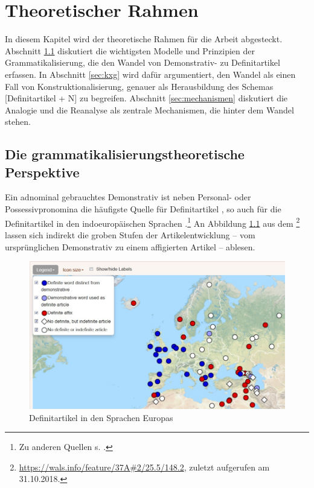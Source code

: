 \chapter{Theoretischer Rahmen} \label{chapter:theorie}

In diesem Kapitel wird der theoretische Rahmen für die Arbeit abgesteckt. 
Abschnitt \ref{sec:gram} diskutiert die wichtigsten Modelle und Prinzipien  der Grammatikalisierung, die den Wandel von Demonstrativ- zu Definitartikel erfassen. In Abschnitt \ref{sec:kxg} wird dafür argumentiert, den Wandel als einen Fall von Konstruktionalisierung, genauer als Herausbildung des Schemas [Definitartikel + N] zu begreifen. Abschnitt \ref{sec:mechanismen} diskutiert die Analogie und die Reanalyse als zentrale Mechanismen, die hinter dem Wandel stehen.  

\section{Die grammatikalisierungstheoretische Perspektive}\label{sec:gram}

Ein adnominal gebrauchtes Demonstrativ ist neben Personal- oder Possessivpronomina die häufigste Quelle für Definitartikel \parencites()(){Himmelmann1997}[215]{Heine2002}, so auch für die Definitartikel in den indoeuropäischen Sprachen \parencite{vonHeusinger2013}.\footnote{Zu anderen Quellen s. \textcites()()[][839]{Himmelmann2001}[523]{deMulder2011}.}
An Abbildung \ref{wals} aus dem \footnote{\url{https://wals.info/feature/37A\#2/25.5/148.2}, zuletzt aufgerufen am 31.10.2018.} lassen sich  indirekt die groben Stufen der Artikelentwicklung -- vom ursprünglichen Demonstrativ zu einem affigierten Artikel -- ablesen. 

\begin{figure}
\begin{center}
  \includegraphics[width=10 cm]{images/wals.jpg}
\caption {Definitartikel in den Sprachen Europas \parencite{Dryer2013}}
\label{wals}
\end{center}
\end{figure} 

